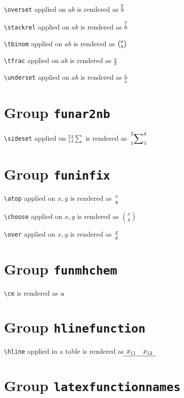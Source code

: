 \texttt{\textbackslash overset} applied on ${a}{b}$ is rendered as $\overset{a}{b}$

\texttt{\textbackslash stackrel} applied on ${a}{b}$ is rendered as $\stackrel{a}{b}$

\texttt{\textbackslash tbinom} applied on ${a}{b}$ is rendered as $\tbinom{a}{b}$

\texttt{\textbackslash tfrac} applied on ${a}{b}$ is rendered as $\tfrac{a}{b}$

\texttt{\textbackslash underset} applied on ${a}{b}$ is rendered as $\underset{a}{b}$

\section{ Group \texttt{fun\textunderscore ar2nb}}

\texttt{\textbackslash sideset} applied on ${_1^2}{_3^4}\sum$ is rendered as $\sideset{_1^2}{_3^4}\sum$

\section{ Group \texttt{fun\textunderscore infix}}

\texttt{\textbackslash atop} applied on $ x, y$ is rendered as $x\atop y$

\texttt{\textbackslash choose} applied on $ x, y$ is rendered as $x\choose y$

\texttt{\textbackslash over} applied on $ x, y$ is rendered as $x\over y$

\section{ Group \texttt{fun\textunderscore mhchem}}

\texttt{\textbackslash ce} is rendered as $\ce{a}$

\section{ Group \texttt{hline\textunderscore function}}

\texttt{\textbackslash hline} applied in a table is rendered as $\begin{matrix}
x_{11} & x_{12} \\
\hline
\end{matrix}$

\section{ Group \texttt{latex\textunderscore function\textunderscore names}}

